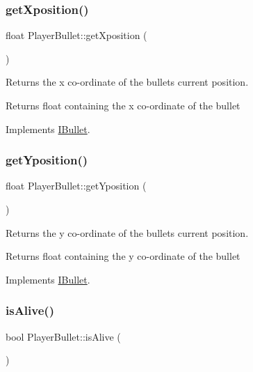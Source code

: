 \subsubsection{\texorpdfstring{get\+Xposition()}{getXposition()}}
{\footnotesize\ttfamily float Player\+Bullet\+::get\+Xposition (\begin{DoxyParamCaption}{ }\end{DoxyParamCaption})\hspace{0.3cm}{\ttfamily [virtual]}}



Returns the x co-\/ordinate of the bullets current position. 

\begin{DoxyReturn}{Returns}
float containing the x co-\/ordinate of the bullet 
\end{DoxyReturn}


Implements \hyperlink{class_i_bullet}{I\+Bullet}.

\mbox{\label{class_player_bullet_a240cab35d5d909366986b8661ee65d3c}} 
\subsubsection{\texorpdfstring{get\+Yposition()}{getYposition()}}
{\footnotesize\ttfamily float Player\+Bullet\+::get\+Yposition (\begin{DoxyParamCaption}{ }\end{DoxyParamCaption})\hspace{0.3cm}{\ttfamily [virtual]}}



Returns the y co-\/ordinate of the bullets current position. 

\begin{DoxyReturn}{Returns}
float containing the y co-\/ordinate of the bullet 
\end{DoxyReturn}


Implements \hyperlink{class_i_bullet}{I\+Bullet}.

\mbox{\label{class_player_bullet_ab4e6b1485e9a63ddc00effc7532a9b09}} 
\subsubsection{\texorpdfstring{is\+Alive()}{isAlive()}}
{\footnotesize\ttfamily bool Player\+Bullet\+::is\+Alive (\begin{DoxyParamCaption}{ }\end{DoxyParamCaption})\hspace{0.3cm}{\ttfamily [virtual]}}



